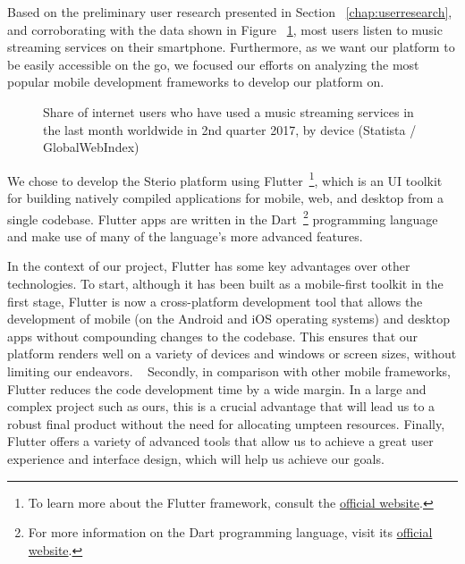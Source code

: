 Based on the preliminary user research presented in Section ~\ref{chap:userresearch}, and corroborating with the data shown in Figure ~\ref{chart:devices}, most users listen to music streaming services on their smartphone. Furthermore, as we want our platform to be easily accessible on the go, we focused our efforts on analyzing the most popular mobile development frameworks to develop our platform on.

\begin{figure}
	\centering
	\caption{Share of internet users who have used a music streaming services in the last month worldwide in 2nd quarter 2017, by device (Statista / GlobalWebIndex)}
	\label{chart:devices}
	\begin{bchart}[step=10,max=45,unit=\%,width=0.8\textwidth]
            \smallskip
            \smallskip
    \end{bchart}
\end{figure}


We chose to develop the Sterio platform using Flutter~\footnote{To learn more about the Flutter framework, consult the \href{https://flutter.dev/}{official website}.}, which is an \ac{UI} toolkit for building natively compiled applications for mobile, web, and desktop from a single codebase. Flutter apps are written in the Dart~\footnote{For more information on the Dart programming language, visit its \href{https://dart.dev/}{official website}.} programming language and make use of many of the language's more advanced features. ~\cite{Payne2019}

In the context of our project, Flutter has some key advantages over other technologies. To start, although it has been built as a mobile-first toolkit in the first stage, Flutter is now a cross-platform development tool that allows the development of mobile (on the Android and iOS operating systems) and desktop apps without compounding changes to the codebase. This ensures that our platform renders well on a variety of devices and windows or screen sizes, without limiting our endeavors. ~\cite{H.GillbertMiller2011} Secondly, in comparison with other mobile frameworks, Flutter reduces the code development time by a wide margin. In a large and complex project such as ours, this is a crucial advantage that will lead us to a robust final product without the need for allocating umpteen resources. Finally, Flutter offers a variety of advanced tools that allow us to achieve a great user experience and interface design, which will help us achieve our goals. ~\cite{Payne2019}

